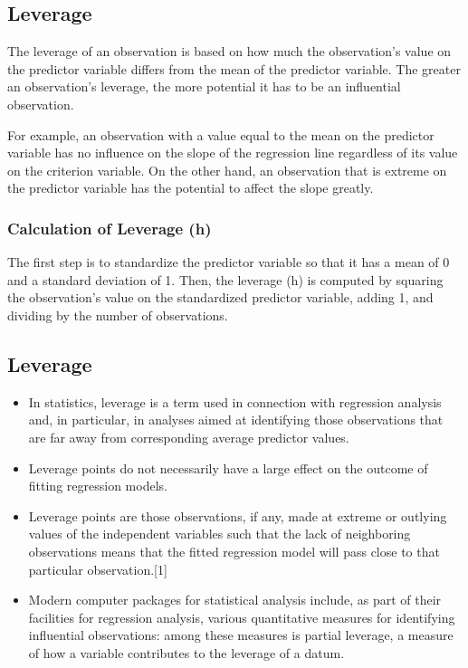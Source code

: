 \documentclass[residuals.tex]{subfiles}
\begin{document}
\newpage

\subsection{Leverage}
The leverage of an observation is based on how much the observation's value on the predictor variable differs from the mean of the predictor variable. The greater an observation's leverage, the more potential it has to be an influential observation. 

For example, an observation with a value equal to the mean on the predictor variable has no influence on the slope of the regression line regardless of its value on the criterion variable. On the other hand, an observation that is extreme on the predictor variable has the potential to affect the slope greatly.

\subsubsection{Calculation of Leverage (h)}
The first step is to standardize the predictor variable so that it has a mean of 0 and a standard deviation of 1. Then, the leverage (h) is computed by squaring the observation's value on the standardized predictor variable, adding 1, and dividing by the number of observations.


\subsection{Leverage}
\begin{itemize}
\item In statistics, leverage is a term used in connection with regression analysis and, in particular, in analyses aimed at identifying those observations that are far away from corresponding average predictor values.

\item  Leverage points do not necessarily have a large effect on the outcome of fitting regression models.

\item Leverage points are those observations, if any, made at extreme or outlying values of the independent variables such that the lack of neighboring observations means that the fitted regression model will pass close to that particular observation.[1]

\item Modern computer packages for statistical analysis include, as part of their facilities for regression analysis, various quantitative measures for identifying influential observations: among these measures is partial leverage, a measure of how a variable contributes to the leverage of a datum.

\end{itemize}
\end{document}
